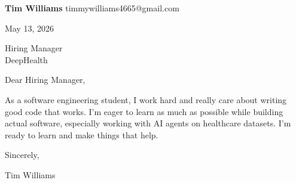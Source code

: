 \documentclass[12pt]{article}
\begin{document}
\textbf{Tim Williams} \hfill timmywilliams4665@gmail.com

\vspace{1em}

May 13, 2026

\vspace{1em}

Hiring Manager \\
DeepHealth

\vspace{1em}

Dear Hiring Manager,

As a software engineering student, I work hard and really care about writing good code that works. I'm eager to learn as much as possible while building actual software, especially working with AI agents on healthcare datasets. I'm ready to learn and make things that help.

\vspace{1em}

Sincerely,

\vspace{2em}

Tim Williams
\end{document}
